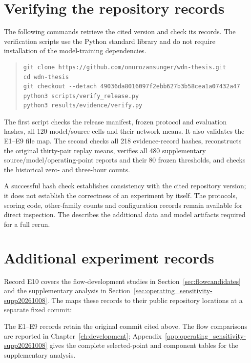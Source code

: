 \section{Verifying the repository records}
The following commands retrieve the cited version and check its records. The verification scripts use the Python standard library and do not require installation of the model-training dependencies.
\begin{quote}\small
\begin{verbatim}
git clone https://github.com/onurozansunger/wdn-thesis.git
cd wdn-thesis
git checkout --detach 49036da8016097f2ebb627b3b58cea1a07432a47
python3 scripts/verify_release.py
python3 results/evidence/verify.py
\end{verbatim}
\end{quote}
The first script checks the release manifest, frozen protocol and evaluation hashes, all 120 model/source cells and their network means. It also validates the E1--E9 file map. The second checks all 218 evidence-record hashes, reconstructs the original thirty-pair replay means, verifies all 480 supplementary source/model/operating-point reports and their 80 frozen thresholds, and checks the historical zero- and three-hour counts.

A successful hash check establishes consistency with the cited repository version; it does not establish the correctness of an experiment by itself. The protocols, scoring code, other-family counts and configuration records remain available for direct inspection. The  describes the additional data and model artifacts required for a full rerun.



\FloatBarrier
\section{Additional experiment records}
\label{sec:supplementrecords}
\label{ev:E10}
Record E10 covers the flow-development studies in Section~\ref{sec:flowcandidates} and the supplementary analysis in Section~\ref{sec:operating_sensitivity-supp20261008}. The  maps these records to their public repository locations at a separate fixed commit:
\begin{center}\small\texttt{\suppcommit}\end{center}
The E1--E9 records retain the original commit cited above. The flow comparisons are reported in Chapter~\ref{ch:development}; Appendix~\ref{app:operating_sensitivity-supp20261008} gives the complete selected-point and component tables for the supplementary analysis.

